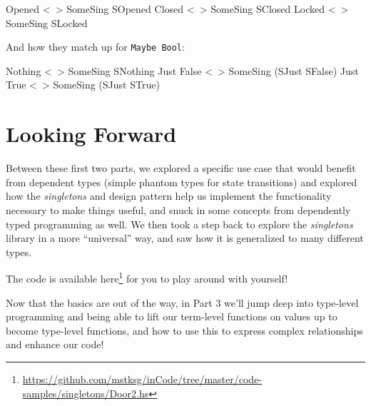 \documentclass[]{article}
\newenvironment{Shaded}{}{}
\newcommand{\DataTypeTok}[1]{\textcolor[rgb]{0.56,0.13,0.00}{#1}}
\newcommand{\NormalTok}[1]{#1}
\newcommand{\OperatorTok}[1]{\textcolor[rgb]{0.40,0.40,0.40}{#1}}
\renewcommand{\href}[2]{#2\footnote{\url{#1}}}
\begin{document}
\begin{Shaded}
\begin{Highlighting}[]
\DataTypeTok{Opened}   \OperatorTok{<~>}    \DataTypeTok{SomeSing} \DataTypeTok{SOpened}
\DataTypeTok{Closed}   \OperatorTok{<~>}    \DataTypeTok{SomeSing} \DataTypeTok{SClosed}
\DataTypeTok{Locked}   \OperatorTok{<~>}    \DataTypeTok{SomeSing} \DataTypeTok{SLocked}
\end{Highlighting}
\end{Shaded}

And how they match up for \texttt{Maybe\ Bool}:

\begin{Shaded}
\begin{Highlighting}[]
\DataTypeTok{Nothing}      \OperatorTok{<~>}  \DataTypeTok{SomeSing} \DataTypeTok{SNothing}
\DataTypeTok{Just} \DataTypeTok{False}   \OperatorTok{<~>}  \DataTypeTok{SomeSing}\NormalTok{ (}\DataTypeTok{SJust} \DataTypeTok{SFalse}\NormalTok{)}
\DataTypeTok{Just} \DataTypeTok{True}    \OperatorTok{<~>}  \DataTypeTok{SomeSing}\NormalTok{ (}\DataTypeTok{SJust} \DataTypeTok{STrue}\NormalTok{)}
\end{Highlighting}
\end{Shaded}

\hypertarget{looking-forward}{%
\section{Looking Forward}\label{looking-forward}}

Between these first two parts, we explored a specific use case that would
benefit from dependent types (simple phantom types for state transitions) and
explored how the \emph{singletons} and design pattern help us implement the
functionality necessary to make things useful, and snuck in some concepts from
dependently typed programming as well. We then took a step back to explore the
\emph{singletons} library in a more ``universal'' way, and saw how it is
generalized to many different types.

The code is available
\href{https://github.com/mstksg/inCode/tree/master/code-samples/singletons/Door2.hs}{here}
for you to play around with yourself!

Now that the basics are out of the way, in Part 3 we'll jump deep into
type-level programming and being able to lift our term-level functions on values
up to become type-level functions, and how to use this to express complex
relationships and enhance our code!
\end{document}
